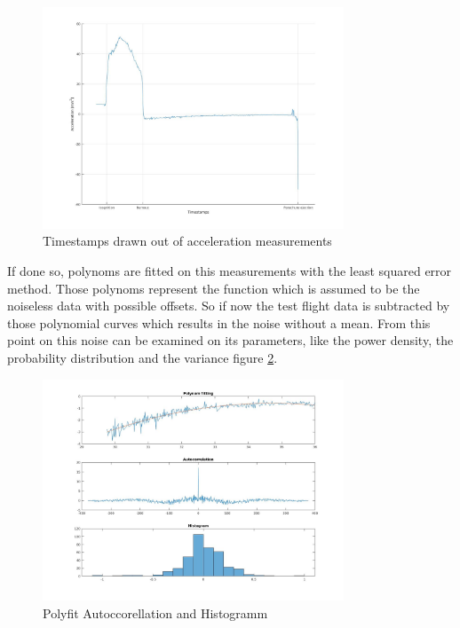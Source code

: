 \begin{figure}[h!]
 \centering
 \includegraphics[width=0.8\textwidth]{./Pictures/AccelerationMarks.jpg}
 \caption{Timestamps drawn out of acceleration measurements}
 \label{fig:AccelerationMarks}
\end{figure}


If done so, polynoms are fitted on this measurements with the least squared error method.
Those polynoms represent the function which is assumed to be the noiseless data with possible offsets.
So if now the test flight data is subtracted by those polynomial curves which results in the noise without a mean.
From this point on this noise can be examined on its parameters, like the power density, the probability distribution and the variance figure \ref{fig:PF_AC_HIST_Accel}.

\begin{figure}[h!]
 \centering
 \includegraphics[width=0.8\textwidth]{./Pictures/PF_AC_HIST_Accel.jpg}
 \caption{Polyfit Autoccorellation and Histogramm}
 \label{fig:PF_AC_HIST_Accel}
\end{figure}


